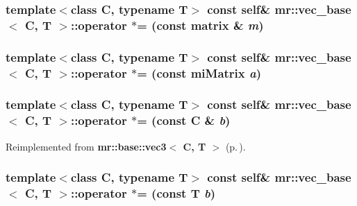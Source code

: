 \subsubsection{\setlength{\rightskip}{0pt plus 5cm}template$<$class C, typename T$>$ const {\bf self}\& {\bf mr::vec\_\-base}$<$ C, T $>$::operator $\ast$= (const {\bf matrix} \& {\em m})\hspace{0.3cm}{\tt  [inline]}}\label{structmr_1_1vec__base_z64_3}


\subsubsection{\setlength{\rightskip}{0pt plus 5cm}template$<$class C, typename T$>$ const {\bf self}\& {\bf mr::vec\_\-base}$<$ C, T $>$::operator $\ast$= (const mi\-Matrix {\em a})\hspace{0.3cm}{\tt  [inline]}}\label{structmr_1_1vec__base_z64_2}


\subsubsection{\setlength{\rightskip}{0pt plus 5cm}template$<$class C, typename T$>$ const {\bf self}\& {\bf mr::vec\_\-base}$<$ C, T $>$::operator $\ast$= (const C \& {\em b})\hspace{0.3cm}{\tt  [inline]}}\label{structmr_1_1vec__base_z64_1}




Reimplemented from {\bf mr::base::vec3$<$ C, T $>$} {\rm (p.\,\pageref{structmr_1_1base_1_1vec3_z40_8})}.
\subsubsection{\setlength{\rightskip}{0pt plus 5cm}template$<$class C, typename T$>$ const {\bf self}\& {\bf mr::vec\_\-base}$<$ C, T $>$::operator $\ast$= (const T {\em b})\hspace{0.3cm}{\tt  [inline]}}\label{structmr_1_1vec__base_z64_0}




